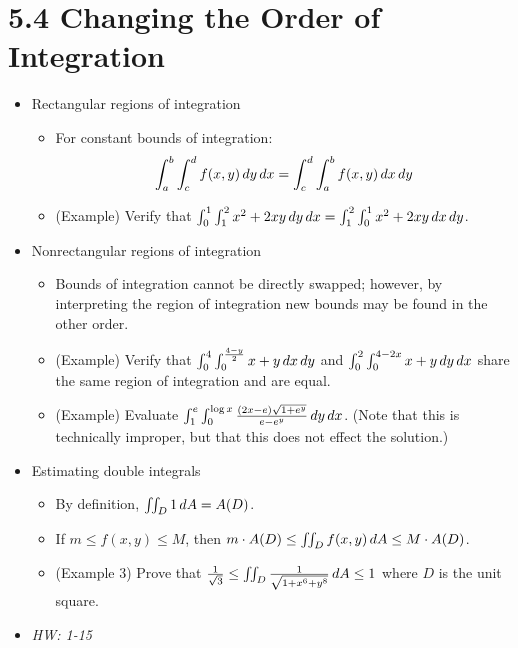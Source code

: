 \documentclass[11pt]{article}
\begin{document}
\section*{5.4 Changing the Order of Integration}
\begin{itemize}
  \item Rectangular regions of integration
    \begin{itemize}
      \item For constant bounds of integration:
        \[
          \int_a^b\int_c^d f(x,y)\,d y\,d x
            =
          \int_c^d\int_a^b f(x,y)\,d x\,d y
        \]
      \item (Example) Verify that
        \(
          \int_0^1\int_1^2 x^2+2xy\,d y\,d x
            =
          \int_1^2\int_0^1 x^2+2xy\,d x\,d y
        \).
    \end{itemize}
  \item Nonrectangular regions of integration
    \begin{itemize}
      \item Bounds of integration cannot be directly swapped; however, by
      interpreting the region of integration new bounds may be found in
      the other order.
      \item (Example) Verify that
        \(
          \int_0^4\int_0^{\frac{4-y}{2}} x+y \,d x\,d y
        \)
      and
        \(
          \int_0^2\int_0^{4-2x} x+y \,d y\,d x
        \)
      share the same region of integration and are equal.
      \item (Example) Evaluate
        \(
          \int_1^e\int_0^{\log x}\frac{(2x-e)\sqrt{1+e^y}}{e-e^y}\,d y\,d x
        \).
        (Note that this is technically improper, but that this does not effect
        the solution.)
    \end{itemize}
  \item Estimating double integrals
    \begin{itemize}
      \item By definition, \(\iint_D 1\,d A=A(D)\).
      \item If \(m\leq f(x,y)\leq M\), then
      \(m\cdot A(D)\leq\iint_D f(x,y)\,d A\leq M\cdot A(D)\).
      \item (Example 3) Prove that
      \(\frac{1}{\sqrt 3}\leq \iint_D \frac{1}{\sqrt{1+x^6+y^8}}\,d A \leq 1\)
      where \(D\) is the unit square.
    \end{itemize}
  \item\textit{
    HW: 1-15
  }
\end{itemize}
\end{document}
